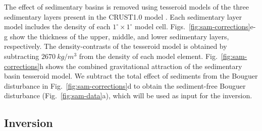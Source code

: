 \documentclass[extra]{gji}
\begin{document}
The effect of sedimentary basins is removed using
tesseroid models of the three sedimentary layers present in the CRUST1.0 model
\citep[][ \url{http://igppweb.ucsd.edu/~gabi/rem.html}]{laske2013}.
Each sedimentary layer model includes the density
of each $1^\circ \times 1^\circ$ model cell.
Figs.~\ref{fig:sam-corrections}e-g show the thickness of the upper, middle, and
lower sedimentary layers, respectively.
The density-contrasts of the tesseroid model is obtained by subtracting
$2670\ kg/m^3$ from the density of each model element.
Fig.~\ref{fig:sam-corrections}h shows the combined gravitational attraction of
the sedimentary basin tesseroid model.
We subtract the total effect of sediments from the Bouguer disturbance in
Fig.~\ref{fig:sam-corrections}d to obtain
the sediment-free Bouguer disturbance (Fig.~\ref{fig:sam-data}a),
which will be used as input for the inversion.


\subsection{Inversion}
\end{document}
